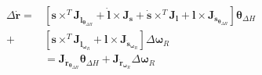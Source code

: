 \begin{equation}
    \begin{split}
        \Delta \dot{\mathbf{r}} =
        &\left[
            \mathbf{s} \times^T \mathbf{J}_{\dot{\mathbf{l}}_{\boldsymbol{\theta}_{\Delta H}}}
            + \dot{\mathbf{l}} \times \mathbf{J}_{\mathbf{s}}
            + \dot{\mathbf{s}} \times^T \mathbf{J}_{\mathbf{l}}
            + \mathbf{l} \times \mathbf{J}_{\dot{\mathbf{s}}_{\boldsymbol{\theta}_{\Delta H}}}
        \right] \boldsymbol{\theta}_{\Delta H} \\
        + &\left[
            \mathbf{s} \times^T \mathbf{J}_{\dot{\mathbf{l}}_{\boldsymbol{\omega}_R}}
            + \mathbf{l} \times \mathbf{J}_{\dot{\mathbf{s}}_{\boldsymbol{\omega}_R}}
        \right] \Delta \boldsymbol{\omega}_R \\
        &= \mathbf{J}_{\dot{\mathbf{r}}_{\boldsymbol{\theta}_{\Delta H}}} \boldsymbol{\theta}_{\Delta H}
        + \mathbf{J}_{\dot{\mathbf{r}}_{\boldsymbol{\omega}_R}} \Delta \boldsymbol{\omega}_R
    \end{split}
\end{equation}
